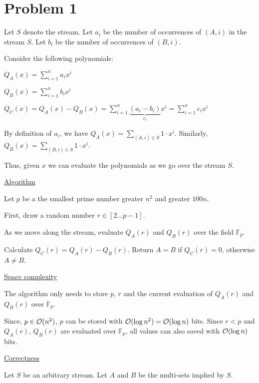\section*{Problem 1}

Let $S$ denote the stream.
Let $a_i$ be the number of occurrences of $(A,i)$ in the stream $S$. Let $b_i$ be the number of occurrences of $(B, i)$.

Consider the following polynomials:

$Q_A(x) = \sum\limits_{i = 1}^n a_ix^i$

$Q_B(x) = \sum\limits_{i = 1}^n b_ix^i$

$Q_C(x) = Q_A(x) - Q_B(x) = \sum\limits_{i = 1}^n \underbrace{(a_i - b_i)}_{c_i} x^i = \sum\limits_{i = 1}^n c_ix^i$

By definition of $a_i$, we have $Q_A(x) = \sum\limits_{(A,i) \in S} 1 \cdot x^i$. Similarly, $Q_B(x) =  \sum\limits_{(B,i) \in S} 1 \cdot x^i.$

Thus, given $x$ we can evaluate the polynomials as we go over the stream $S$.


\underline{Algorithm}

Let $p$ be a the smallest prime number greater $n^2$ and greater $100n$. 

First, draw a random number $r \in [2...p-1]$.

As we move along the stream, evaluate $Q_A(r)$ and $Q_B(r)$ over the field $\mathbb{F}_p$.

Calculate $Q_C(r) = Q_A(r) - Q_B(r)$. Return $A = B$ if $Q_C(r) = 0$, otherwise $A \neq B$.

\underline{Space complexity}

The algorithm only needs to store $p$, $r$ and the current evaluation of $Q_A(r)$ and $Q_B(r)$ over $\mathbb{F}_p$.

Since, $p \in \mathcal{O}(n^2)$, $p$ can be stored with $\mathcal{O}(\log n^2) = \mathcal{O}(\log n)$ bits. Since $r < p$ and $Q_A(r)$, $Q_B(r)$ are evaluated over $\mathbb{F}_p$, all values can also saved with $\mathcal{O}(\log n)$ bits.

\underline{Correctness}

Let $S$ be an arbitrary stream. Let $A$ and $B$ be the multi-sets implied by $S$.

